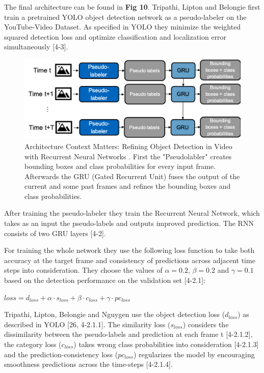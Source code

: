 \documentclass[conference]{IEEEtran}
\begin{document}
The final architecture can be found in \textbf{Fig 10}. Tripathi, Lipton and Belongie first train a pretrained YOLO object detection network \cite{b20} as a  pseudo-labeler on the YouTube-Video Dataset. As specified in YOLO  they minimize the weighted squared detection loss and optimize classification and localization error simultaneously [4-3]. 

\begin{figure} [h]
\includegraphics[width=\columnwidth]{ContextMatters}
\caption{Architecture Context Matters: Refining Object Detection in Video with Recurrent Neural Networks \cite{b4}. First the "Pseudolabler" creates bounding boxes and class probabilities for every input frame. Afterwards the GRU (Gated Recurrent Unit) fuses the output of the current and some past frames and refines the bounding boxes and class probabilities.}
\end{figure}

After training the pseudo-labeler they train the Recurrent Neural Network, which takes as an input the pseudo-labels and outputs improved prediction. The RNN consists of two GRU layers [4-2]. \newline

For training the whole network they use the following loss function to take both accuracy at the target frame and consistency of predictions across adjacent time steps into consideration. They choose the values of $\alpha = 0.2$, $\beta = 0.2$ and $\gamma = 0.1$ based on the detection performance on the validation set [4-2.1]: \newline

$ loss = d_{loss} + \alpha \cdot s_{loss} + \beta \cdot c_{loss} + \gamma \cdot pc_{loss} $ \newline

Tripathi, Lipton, Belongie and Nguygen use the object detection loss ($d_{loss}$) as described in YOLO [26, 4-2.1.1]. The similarity loss ($s_{loss}$) considers the dissimilarity between the pseudo-labels and prediction at each frame t [4-2.1.2], the category loss ($c_{loss}$) takes wrong class probabilities into consideration [4-2.1.3] and the prediction-consistency loss ($pc_{loss}$) regularizes the model by encouraging smoothness predictions across the time-steps [4-2.1.4]. \newline
\end{document}
